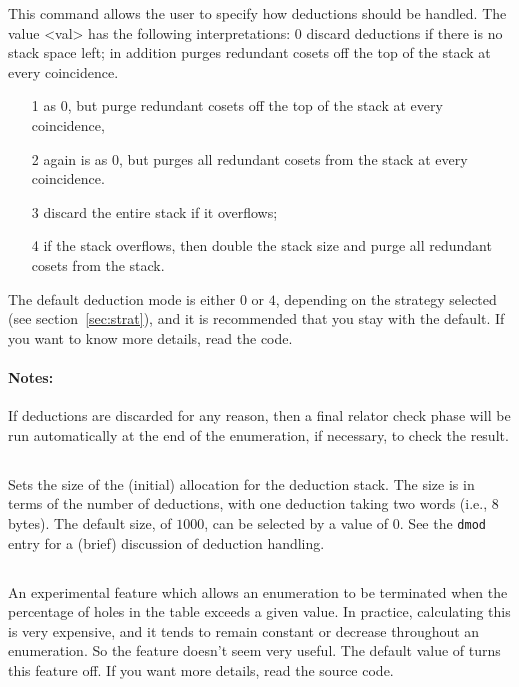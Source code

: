 This command allows the user to specify how
deductions should be handled.  The value <val> has the following
interpretations: 0 discard deductions if there is no stack space left; in
addition purges redundant cosets off the top of the stack at every
coincidence. 
\begin{itemize}
\item[1] as 0, but purge redundant cosets off the top of the stack
  at every coincidence,
\item[2] again is as 0,
but purges all redundant cosets from the stack at 
every coincidence.
\item[3] discard the entire stack if it overflows;
\item[4] if the stack overflows, then double the stack size and purge all
  redundant cosets from the stack.
\end{itemize}

The default deduction mode is either $0$ or $4$, depending on the strategy
selected (see section~\ref{sec:strat}), and it is recommended that
you stay with the default.  If you want to know more details, read the code.

\paragraph{Notes:}
If deductions are discarded for any reason, then a final relator
check phase will
be run automatically at the end of the enumeration, if necessary, to check
the result.

\subsection{}
\label{cmd:ded size}
\label{cmd:dsize}
Sets the size of the (initial) allocation for the deduction stack.
The size is in terms of the number of deductions, with one deduction
  taking two words (i.e., 8 bytes).
The default size, of $1000$, can be selected by a value of 0.
See the {\tt dmod} entry for a (brief) discussion of deduction handling.

\subsection{}
\label{cmd:hole limit}

An experimental feature which allows an enumeration to be terminated when
  the percentage of holes in the table exceeds a given value.
In practice, calculating this is very expensive, and it tends to remain
  constant or decrease throughout an enumeration.
So the feature doesn't seem very useful.
The default value of  turns this feature off.
If you want more details, read the source code.

